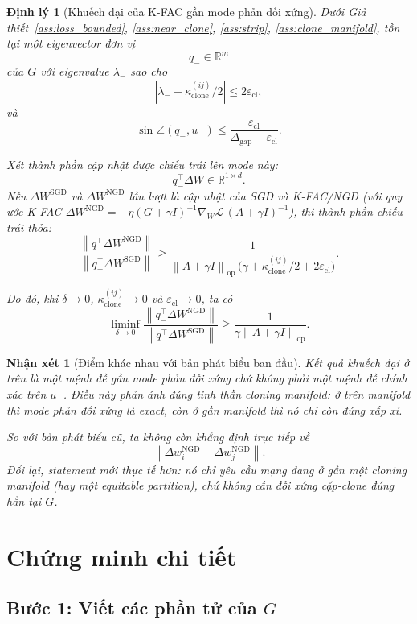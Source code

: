 \documentclass[11pt,a4paper]{article}
\newtheorem{theorem}{Định lý}
\newtheorem{remark}{Nhận xét}
\newcommand{\R}{\mathbb{R}}
\newcommand{\norm}[1]{\left\lVert #1 \right\rVert}
\newcommand{\abs}[1]{\left\lvert #1 \right\rvert}
\DeclareMathOperator{\op}{op}
\begin{document}
\begin{theorem}[Khuếch đại của K-FAC gần mode phản đối xứng]
\label{thm:clone_amp}
Dưới Giả thiết~\ref{ass:loss_bounded}, \ref{ass:near_clone},
\ref{ass:strip}, \ref{ass:clone_manifold}, tồn tại một eigenvector đơn vị
\[
q_- \in \R^m
\]
của $G$ với eigenvalue $\lambda_-$ sao cho
\[
\abs{\lambda_- - \kappa_{\mathrm{clone}}^{(ij)}/2}
\le
2\varepsilon_{\mathrm{cl}},
\]
và
\[
\sin \angle(q_-,u_-)
\le
\frac{\varepsilon_{\mathrm{cl}}}{\Delta_{\mathrm{gap}}-\varepsilon_{\mathrm{cl}}}.
\]

Xét thành phần cập nhật được chiếu trái lên mode này:
\[
q_-^\top \Delta W \in \R^{1\times d}.
\]
Nếu $\Delta W^{\mathrm{SGD}}$ và $\Delta W^{\mathrm{NGD}}$ lần lượt là cập nhật của
SGD và K-FAC/NGD (với quy ước K-FAC $\Delta W^{\mathrm{NGD}} = -\eta(G+\gamma I)^{-1}\nabla_W\mathcal{L}\,(A+\gamma I)^{-1}$),
thì thành phần chiếu trái thỏa:
\[
\frac{\norm{q_-^\top \Delta W^{\mathrm{NGD}}}}
{\norm{q_-^\top \Delta W^{\mathrm{SGD}}}}
\ge
\frac{1}{\norm{A+\gamma I}_{\op}\,\bigl(\gamma + \kappa_{\mathrm{clone}}^{(ij)}/2 + 2\varepsilon_{\mathrm{cl}}\bigr)}.
\]

Do đó, khi $\delta \to 0$, $\kappa_{\mathrm{clone}}^{(ij)} \to 0$ và $\varepsilon_{\mathrm{cl}} \to 0$, ta có
\[
\liminf_{\delta \to 0}
\frac{\norm{q_-^\top \Delta W^{\mathrm{NGD}}}}
{\norm{q_-^\top \Delta W^{\mathrm{SGD}}}}
\ge
\frac{1}{\gamma \norm{A+\gamma I}_{\op}}.
\]
\end{theorem}

\begin{remark}[Điểm khác nhau với bản phát biểu ban đầu]
Kết quả khuếch đại ở trên là một mệnh đề \emph{gần mode phản đối xứng} chứ không
phải một mệnh đề chính xác trên $u_-$. Điều này phản ánh đúng tinh thần cloning
manifold: ở trên manifold thì mode phản đối xứng là exact, còn ở gần manifold thì
nó chỉ còn đúng xấp xỉ.

So với bản phát biểu cũ, ta không còn khẳng định trực tiếp về
\[
\norm{\Delta w_i^{\mathrm{NGD}} - \Delta w_j^{\mathrm{NGD}}}.
\]
Đổi lại, statement mới thực tế hơn: nó chỉ yêu cầu mạng đang ở gần một
\emph{cloning manifold} (hay một \emph{equitable partition}), chứ không cần
đối xứng cặp-clone đúng hẳn tại $G$.
\end{remark}

\section{Chứng minh chi tiết}

\subsection*{Bước 1: Viết các phần tử của $G$}
\end{document}
